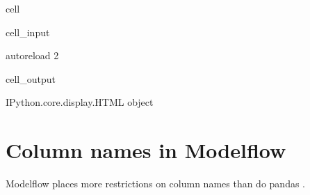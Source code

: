 \documentclass[letterpaper,10pt,english]{jupyterBook}
\begin{document}
\begin{sphinxuseclass}{cell}\begin{sphinxVerbatimInput}

\begin{sphinxuseclass}{cell_input}
\begin{sphinxVerbatim}[commandchars=\\\{\}]
 autoreload
 2

   

    
\end{sphinxVerbatim}

\end{sphinxuseclass}\end{sphinxVerbatimInput}
\begin{sphinxVerbatimOutput}

\begin{sphinxuseclass}{cell_output}
\begin{sphinxVerbatim}[commandchars=\\\{\}]
\PYGZlt{}IPython.core.display.HTML object\PYGZgt{}
\end{sphinxVerbatim}

\end{sphinxuseclass}\end{sphinxVerbatimOutput}

\end{sphinxuseclass}

\section{Column names in  Modelflow}
\label{\detokenize{content/04_PythonEssentials/UpdateCommand:column-names-in-modelflow}}
\begin{sphinxShadowBox}

\sphinxAtStartPar
Modelflow places more restrictions on column names than do pandas .
\end{sphinxShadowBox}
\end{document}
